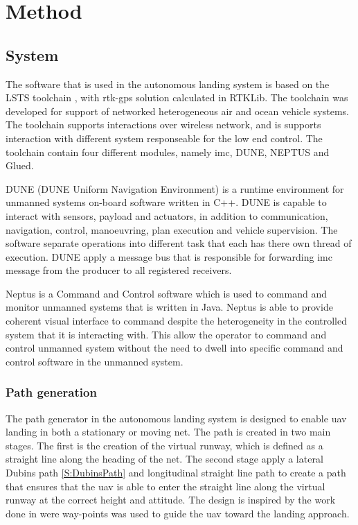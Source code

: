 \part{Method}

\chapter{System}
The software that is used in the autonomous landing system is based on the LSTS toolchain \citep{pinto2013lsts}, with \gls{rtk-gps} solution calculated in RTKLib. The toolchain was developed for support of networked heterogeneous air and ocean vehicle systems. The toolchain supports interactions over wireless network, and is supports interaction with different system responseable for the low end control. The toolchain contain four different modules, namely \gls{imc}, DUNE, NEPTUS and Glued.

DUNE (DUNE Uniform Navigation Environment) is a runtime environment for unmanned systems on-board software written in C++. DUNE is capable to interact with sensors, payload and actuators, in addition to communication, navigation, control, manoeuvring, plan execution and vehicle supervision. The software separate operations into different task that each has there own thread of execution. DUNE apply a message bus that is responsible for forwarding \gls{imc} message from the producer to all registered receivers.

Neptus is a Command and Control software which is used to command and monitor unmanned systems that is written in Java. Neptus is able to provide coherent visual interface to command despite the heterogeneity in the controlled system that it is interacting with.  This allow the operator to command and control unmanned system without the need to dwell into specific command and control software in the unmanned system.
\section{Path generation}
The path generator in the  autonomous landing system is designed to enable \gls{uav} landing in both a stationary or moving net. The path is created in two main stages. The first is the creation of the virtual runway, which is defined as a straight line along the heading of the net. The second stage apply a lateral Dubins path \ref{S:DubinsPath} and longitudinal straight line path to create a path that ensures that the \gls{uav} is able to enter the straight line along the virtual runway at the correct height and attitude. The design is inspired by the work done in \citep{Skulstad&Syversen} were way-points was used to guide the \gls{uav} toward the landing approach.

